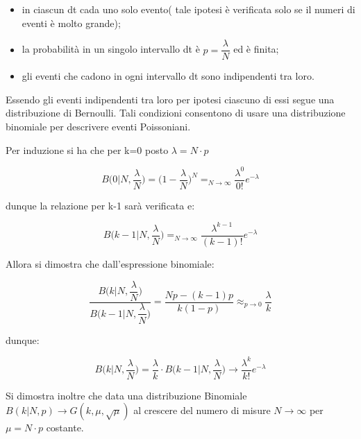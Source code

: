 \begin{itemize}
	\item in ciascun dt cada uno solo evento( tale ipotesi \`{e} verificata solo se il numeri di eventi \`{e} molto grande);
	\item la probabilit\`{a} in un singolo intervallo dt \`{e} $p = \dfrac{\lambda}{N}$ ed \`{e} finita;
	\item gli eventi che cadono in ogni intervallo dt sono indipendenti tra loro.
	
\end{itemize}

Essendo gli eventi indipendenti tra loro per ipotesi ciascuno di essi segue una distribuzione di Bernoulli. Tali condizioni consentono di usare una distribuzione binomiale per descrivere eventi Poissoniani.

Per induzione si ha che per k=0 posto $\lambda = N \cdot p$

\begin{equation*}
	B \Big (0\vert N, \dfrac{\lambda}{N} \Big ) = \Big (1- \dfrac{\lambda}{N} \Big )^N =_{N \rightarrow \infty} \dfrac{\lambda^0}{0!}e^{-\lambda}
\end{equation*}

dunque la relazione per k-1 sar\`{a} verificata e:

\begin{equation*}
	B \Big (k-1\vert N,\frac{\lambda}{N} \Big ) =_{N \rightarrow \infty} \dfrac{\lambda^{k-1}}{(k-1)!} e^{- \lambda}
\end{equation*}

Allora si dimostra che dall'espressione binomiale:

\begin{equation*}
	\dfrac{B \Big (k  \vert N , \dfrac{\lambda}{N}\Big)}{B \Big(k-1 \vert N, \dfrac{\lambda}{N} \Big) } = \dfrac{Np- (k-1)p}{k(1-p)} \approx_{p \rightarrow 0} \dfrac{\lambda}{k}
\end{equation*}


 dunque:
 
 \begin{equation*}
 	B \Big (k  \vert N , \dfrac{\lambda}{N}\Big) = \dfrac{\lambda}{k} \cdot B \Big(k-1 \vert N, \dfrac{\lambda}{N} \Big) \rightarrow \dfrac{\lambda^{k}}{k!} e^{-\lambda}
 \end{equation*}
\newline

Si dimostra inoltre che data una distribuzione Binomiale $B(k \vert N,p) \rightarrow G(k,\mu,\sqrt{\mu})$ al crescere del numero di misure $N \rightarrow \infty $ per $\mu = N \cdot p$ costante.
\newline


